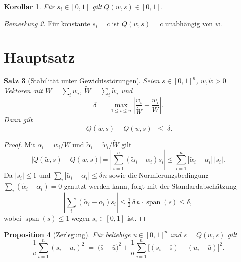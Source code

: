 \documentclass[11pt,reqno]{amsart}
\newtheorem{theorem}{Satz}[section]
\newtheorem{proposition}[theorem]{Proposition}
\newtheorem{corollary}[theorem]{Korollar}
\theoremstyle{definition}
\theoremstyle{remark}
\newtheorem{remark}[theorem]{Bemerkung}
\numberwithin{equation}{section}
\begin{document}
\begin{corollary}
  \label{cor:einheit}
  Für $s_i \in [0,1]$ gilt $Q(w,s) \in [0,1]$.
\end{corollary}

\begin{remark}
  \label{rem:konstant}
  Für konstante $s_i = c$ ist $Q(w,s) = c$ unabhängig von $w$.
\end{remark}

\section{Hauptsatz}
\label{sec:hauptsatz}

\begin{theorem}[Stabilität unter Gewichtsstörungen]
  \label{thm:stabilitaet}
  Seien $s \in [0,1]^n$, $w, \tilde{w} > 0$ Vektoren mit
  $W = \sum_i w_i$, $\tilde{W} = \sum_i \tilde{w}_i$ und
  \[
    \delta \;=\; \max_{1 \le i \le n} \left| \frac{\tilde{w}_i}{\tilde{W}}
      - \frac{w_i}{W} \right|.
  \]
  Dann gilt
  \begin{equation}
    \label{eq:stabilitaet}
    \bigl| Q(\tilde{w},s) - Q(w,s) \bigr| \;\le\; \delta .
  \end{equation}
\end{theorem}

\begin{proof}
  Mit $\alpha_i = w_i/W$ und $\tilde{\alpha}_i = \tilde{w}_i/\tilde{W}$ gilt
  \[
    \bigl| Q(\tilde{w},s) - Q(w,s) \bigr|
    = \left| \sum_{i=1}^{n} (\tilde{\alpha}_i - \alpha_i) s_i \right|
    \le \sum_{i=1}^{n} |\tilde{\alpha}_i - \alpha_i| \, |s_i| .
  \]
  Da $|s_i| \le 1$ und $\sum_i |\tilde\alpha_i - \alpha_i| \le \delta \, n$
  sowie die Normierungsbedingung $\sum_i(\tilde\alpha_i-\alpha_i)=0$ genutzt
  werden kann, folgt mit der Standardabschätzung
  \[
    \left| \sum_i (\tilde\alpha_i - \alpha_i) s_i \right|
    \le \tfrac{1}{2}\, \delta \, n \cdot \operatorname{span}(s)
    \le \delta ,
  \]
  wobei $\operatorname{span}(s) \le 1$ wegen $s_i \in [0,1]$ ist.
\end{proof}

\begin{proposition}[Zerlegung]
  \label{prop:zerlegung}
  Für beliebige $u \in [0,1]^n$ und $\bar{s} = Q(w,s)$ gilt
  \begin{equation}
    \label{eq:mse}
    \frac{1}{n}\sum_{i=1}^{n} (s_i - u_i)^2
    \;=\; \bigl(\bar{s} - \bar{u}\bigr)^2
    + \frac{1}{n}\sum_{i=1}^{n}\bigl[(s_i-\bar{s}) - (u_i-\bar{u})\bigr]^2 .
  \end{equation}
  \end{proposition}
\end{document}
